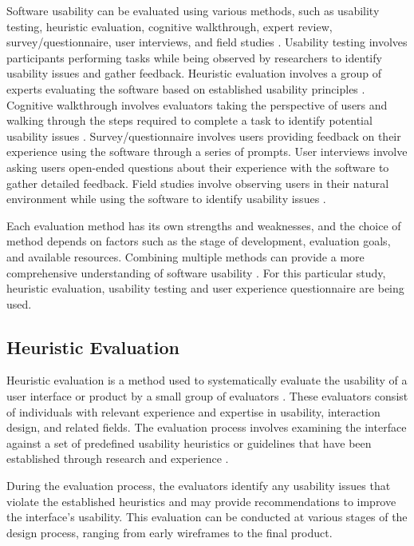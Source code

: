 \documentclass[conference,onecolumn]{IEEEtran}
\begin{document}
    Software usability can be evaluated using various methods, such as usability testing, heuristic evaluation, cognitive walkthrough, expert review, survey/questionnaire, user interviews, and field studies \cite{sauro2012standardized}. Usability testing involves participants performing tasks while being observed by researchers to identify usability issues and gather feedback. Heuristic evaluation involves a group of experts evaluating the software based on established usability principles \cite{rubin2008handbook}. Cognitive walkthrough involves evaluators taking the perspective of users and walking through the steps required to complete a task to identify potential usability issues \cite{albert2013measuring}. Survey/questionnaire involves users providing feedback on their experience using the software through a series of prompts. User interviews involve asking users open-ended questions about their experience with the software to gather detailed feedback. Field studies involve observing users in their natural environment while using the software to identify usability issues \cite{sauro2016quantifying}.

    Each evaluation method has its own strengths and weaknesses, and the choice of method depends on factors such as the stage of development, evaluation goals, and available resources. Combining multiple methods can provide a more comprehensive understanding of software usability \cite{hartson2012ux}. For this particular study, heuristic evaluation, usability testing and user experience questionnaire are being used.

	\subsection{Heuristic Evaluation}
        Heuristic evaluation is a method used to systematically evaluate the usability of a user interface or product by a small group of evaluators \cite{nielsen1994heuristic}. These evaluators consist of individuals with relevant experience and expertise in usability, interaction design, and related fields. The evaluation process involves examining the interface against a set of predefined usability heuristics or guidelines that have been established through research and experience \cite{nielsen1994heuristic}.

        During the evaluation process, the evaluators identify any usability issues that violate the established heuristics and may provide recommendations to improve the interface's usability. This evaluation can be conducted at various stages of the design process, ranging from early wireframes to the final product.
        
\end{document}
